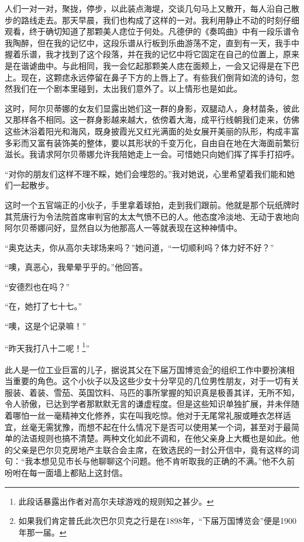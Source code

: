 \par 人们一对一对，聚拢，停步，以此装点海堤，交谈几句马上又散开，每人沿自己散步的路线走去。那天早晨，我们也构成了这样的一对。我利用静止不动的时刻仔细观看，终于确切知道了那颗美人痣位于何处。凡德伊的《奏鸣曲》中有一段乐谱令我陶醉，但在我的记忆中，这段乐谱从行板到乐曲游荡不定，直到有一天，我手中握着乐谱，我才找到了这个段落，并在我的记忆中将它固定在自己的位置上，原来是在谐谑曲中。与此相同，我一会忆起那颗美人痣在面颊上，一会又记得是在下巴上。现在，这颗痣永远停留在鼻子下方的上唇上了。有些我们倒背如流的诗句，忽然我们在一个剧本里碰到，太出我们意外了。以上情形也是如此。
\par 这时，阿尔贝蒂娜的女友们显露出她们这一群的身影，双腿动人，身材苗条，彼此又那样各不相同。这一群身影越来越大，依傍着大海，成平行线朝我们走来，仿佛这些沐浴着阳光和海风，既身披霞光又红光满面的处女展开美丽的队形，构成丰富多彩而又富有装饰美的整体，要以其形状的千变万化，自由自在地在大海面前繁衍滋长。我请求阿尔贝蒂娜允许我陪她走上一会。可惜她只向她们挥了挥手打招呼。
\par “对你的朋友们这样不理不睬，她们会埋怨的。”我对她说，心里希望着我们能和她们一起散步。
\par 这时一个五官端正的小伙子，手里拿着球拍，走到我们跟前。他就是那个玩纸牌时其荒唐行为令法院首席审判官的太太气愤不已的人。他态度冷淡地、无动于衷地向阿尔贝蒂娜问好，显然自以为他那高人一等就表现在这种神情中。
\par “奥克达夫，你从高尔夫球场来吗？”她问道，“一切顺利吗？体力好不好？”
\par “噢，真恶心，我晕晕乎乎的。”他回答。
\par “安德烈也在吗？”
\par “在，她打了七十七。”
\par “噢，这是个记录嘛！”
\par “昨天我打八十二呢！\footnote{此段话暴露出作者对高尔夫球游戏的规则知之甚少。}”
\par 此人是一位工业巨富的儿子，据说其父在下届万国博览会\footnote{如果我们肯定普氏此次巴尔贝克之行是在1898年，“下届万国博览会”便是1900年那一届。}的组织工作中要扮演相当重要的角色。这个小伙子以及这些少女十分罕见的几位男性朋友，对于一切有关服装、着装、雪茄、英国饮料、马匹的事所掌握的知识真是极善其详，无所不知，令人骄傲，已达到学者那默默无言的谦虚程度。但是这些知识单独扩展，并未伴随着哪怕一丝一毫精神文化修养，实在叫我吃惊。他对于无尾常礼服或睡衣怎样适宜，丝毫无需犹豫，而想不起在什么情况下是否可以使用某一个词，甚至对于最简单的法语规则也搞不清楚。两种文化如此不调和，在他父亲身上大概也是如此。他的父亲是巴尔贝克房地产主联合会主席，在致选民的一封公开信中，竟有这样的词句：“我本想见见市长与他聊聊这个问题。他不肯听取我的正确的不满。”他不久前吩咐在每一面墙上都贴上这封信。

